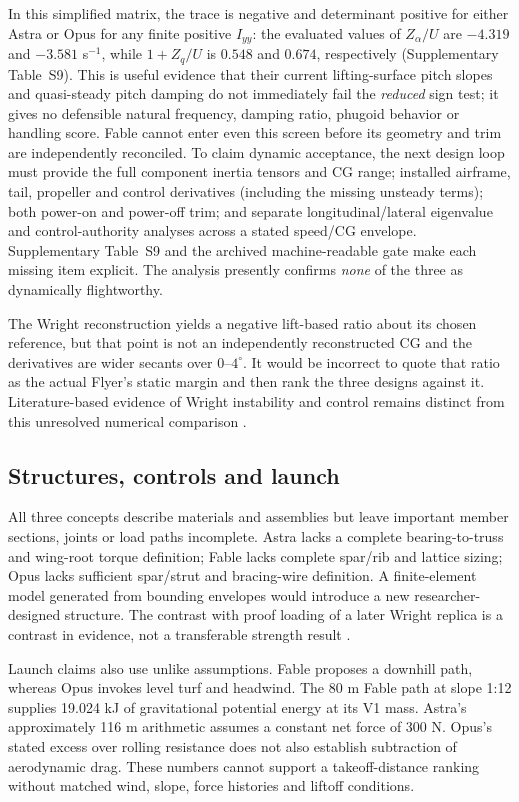 \documentclass[11pt,a4paper]{article}
\begin{document}
In this simplified matrix, the trace is negative and determinant positive for either Astra or Opus for any finite positive $I_{yy}$: the evaluated values of $Z_\alpha/U$ are $-4.319$ and $-3.581$ s$^{-1}$, while $1+Z_q/U$ is $0.548$ and $0.674$, respectively (Supplementary Table~S9). This is useful evidence that their current lifting-surface pitch slopes and quasi-steady pitch damping do not immediately fail the \emph{reduced} sign test; it gives no defensible natural frequency, damping ratio, phugoid behavior or handling score. Fable cannot enter even this screen before its geometry and trim are independently reconciled. To claim dynamic acceptance, the next design loop must provide the full component inertia tensors and CG range; installed airframe, tail, propeller and control derivatives (including the missing unsteady terms); both power-on and power-off trim; and separate longitudinal/lateral eigenvalue and control-authority analyses across a stated speed/CG envelope. Supplementary Table~S9 and the archived machine-readable gate make each missing item explicit. The analysis presently confirms \emph{none} of the three as dynamically flightworthy.



The Wright reconstruction yields a negative lift-based ratio about its chosen reference, but that point is not an independently reconstructed CG and the derivatives are wider secants over $0$--$4^\circ$. It would be incorrect to quote that ratio as the actual Flyer's static margin and then rank the three designs against it. Literature-based evidence of Wright instability and control remains distinct from this unresolved numerical comparison \cite{ref6,ref10}.

\subsection{Structures, controls and launch}
All three concepts describe materials and assemblies but leave important member sections, joints or load paths incomplete. Astra lacks a complete bearing-to-truss and wing-root torque definition; Fable lacks complete spar/rib and lattice sizing; Opus lacks sufficient spar/strut and bracing-wire definition. A finite-element model generated from bounding envelopes would introduce a new researcher-designed structure. The contrast with proof loading of a later Wright replica is a contrast in evidence, not a transferable strength result \cite{ref14}.

Launch claims also use unlike assumptions. Fable proposes a downhill path, whereas Opus invokes level turf and headwind. The 80 m Fable path at slope 1:12 supplies 19.024 kJ of gravitational potential energy at its V1 mass. Astra's approximately 116 m arithmetic assumes a constant net force of 300 N. Opus's stated excess over rolling resistance does not also establish subtraction of aerodynamic drag. These numbers cannot support a takeoff-distance ranking without matched wind, slope, force histories and liftoff conditions.
\end{document}
